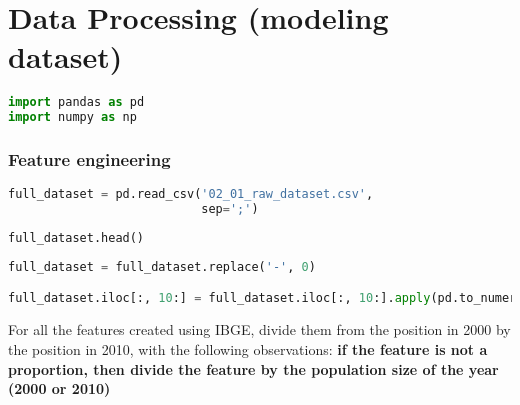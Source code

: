 
\label{ape:data_processing_modeling_dataset}
\hypertarget{data-processing-modeling-dataset}{%
\section{Data Processing (modeling
dataset)}\label{data-processing-modeling-dataset}}

\begin{lstlisting}[language=Python]
import pandas as pd
import numpy as np
\end{lstlisting}

\hypertarget{feature-engineering}{%
\subsubsection{Feature engineering}\label{feature-engineering}}

\begin{lstlisting}[language=Python]
full_dataset = pd.read_csv('02_01_raw_dataset.csv',
                           sep=';')
\end{lstlisting}

\begin{lstlisting}[language=Python]
full_dataset.head()
\end{lstlisting}

\begin{lstlisting}[language=Python]
full_dataset = full_dataset.replace('-', 0)

full_dataset.iloc[:, 10:] = full_dataset.iloc[:, 10:].apply(pd.to_numeric)
\end{lstlisting}

For all the features created using IBGE, divide them from the position
in 2000 by the position in 2010, with the following observations:
\textbf{if the feature is not a proportion, then divide the feature by
the population size of the year (2000 or 2010)}

